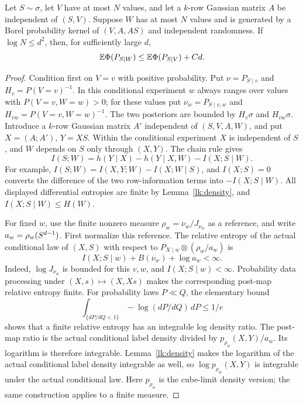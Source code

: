 \begin{proposition}\label{lk:drift}
Let \(S\sim\sigma\), let
\(V\) have at most \(N\) values, and let a \(k\)-row Gaussian
matrix \(A\) be independent of \((S,V)\). Suppose \(W\) has at most
\(N\) values and is generated by a Borel probability kernel of
\((V,A,AS)\) and independent randomness. If \(\log N\le d^2\),
then, for sufficiently large \(d\),
\[
 \mathbb E\Phi(P_{S\mid W})\le \mathbb E\Phi(P_{S\mid V})+Cd.
\]
\end{proposition}
\begin{proof}
Condition first on \(V=v\) with positive probability. Put
\(\nu=P_{S\mid v}\) and \(H_v=P(V=v)^{-1}\). In this conditional
experiment \(w\) always ranges over values with \(P(V=v,W=w)>0\);
for these values put
\(\nu_w=P_{S\mid v,w}\) and \(H_{vw}=P(V=v,W=w)^{-1}\).
The two posteriors are bounded by \(H_v\sigma\) and
\(H_{vw}\sigma\). Introduce a \(k\)-row Gaussian matrix \(A'\)
independent of \((S,V,A,W)\), and put \(X=(A;A')\), \(Y=XS\).
Within the conditional experiment \(X\) is independent of \(S\),
and \(W\) depends on \(S\) only through \((X,Y)\). The chain rule gives
\begin{equation}\label{lk:identity}
 I(S;W)=h(Y\mid X)-h(Y\mid X,W)-I(X;S\mid W).
\end{equation}
For example,
\(I(S;W)=I(X,Y;W)-I(X;W\mid S)\), and \(I(X;S)=0\)
converts the difference of the two row-information terms into
\(-I(X;S\mid W)\). All displayed differential entropies are finite
by Lemma~\ref{lk:density}, and \(I(X;S\mid W)\le H(W)\).

For fixed \(w\), use the finite nonzero measure
\(\rho_w=\nu_w/J_{\nu_w}\) as a reference, and write
\(a_w=\rho_w(S^{d-1})\). First normalize this reference.
The relative entropy of the actual conditional law of \((X,S)\)
with respect to \(P_{X\mid w}\otimes(\rho_w/a_w)\) is
\[
 I(X;S\mid w)+B(\nu_w)+\log a_w<\infty.
\]
Indeed, \(\log J_{\nu_w}\) is bounded for this \(v,w\), and
\(I(X;S\mid w)<\infty\). Probability data processing under
\((X,s)\mapsto(X,Xs)\) makes the corresponding post-map relative
entropy finite. For probability laws \(P\ll Q\), the elementary bound
\[
 \int_{\{dP/dQ<1\}}-\log(dP/dQ)\,dP\le 1/e
\]
shows that a finite relative entropy has an integrable log density
ratio. The post-map ratio is the actual conditional label density
divided by \(p_{\rho_w}(X,Y)/a_w\). Its logarithm is therefore
integrable. Lemma~\ref{lk:density} makes the logarithm of the actual
conditional label density integrable as well, so
\(\log p_{\rho_w}(X,Y)\) is integrable under the actual conditional
law. Here \(p_{\rho_w}\) is the cube-limit density version; the same
construction applies to a finite measure.


\end{proof}
